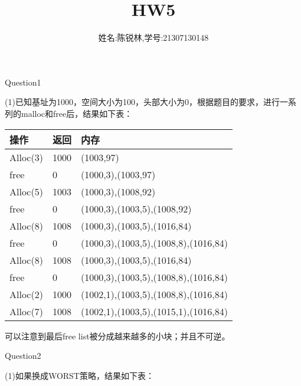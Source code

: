\documentclass[11pt]{article}
\title{HW5}
\author{姓名:陈锐林,学号:21307130148}
\begin{document}
\maketitle
\begin{large}
	\noindent Question1\\
\end{large}
\hspace*{2em}(1)已知基址为1000，空间大小为100，头部大小为0，根据题目的要求，进行一系列的malloc和free后，结果如下表：\\
\begin{tabular}{p{2cm}p{2cm}p{11cm}}  %
    \toprule[2pt]
    操作 & 返回 & 内存 \\ %
    \midrule[2pt]
    Alloc(3)    & 1000      & (1003,97)      \\
    free        & 0 & (1000,3),(1003,97) \\
    Alloc(5)    & 1003 & (1000,3),(1008,92) \\
    free        & 0 & (1000,3),(1003,5),(1008,92) \\
    Alloc(8)    & 1008 & (1000,3),(1003,5),(1016,84) \\
    free        & 0 & (1000,3),(1003,5),(1008,8),(1016,84) \\
    Alloc(8)    & 1008 & (1000,3),(1003,5),(1016,84) \\
    free        & 0 & (1000,3),(1003,5),(1008,8),(1016,84) \\
    Alloc(2)    & 1000 & (1002,1),(1003,5),(1008,8),(1016,84) \\
    Alloc(7)    & 1008 & (1002,1),(1003,5),(1015,1),(1016,84) \\
    \bottomrule[2pt]
\end{tabular}
\hspace*{2em}可以注意到最后free list被分成越来越多的小块；并且不可逆。\\
\begin{large}
	\noindent Question2\\
\end{large}
\hspace*{2em}(1)如果换成WORST策略，结果如下表：\\
\end{document}
